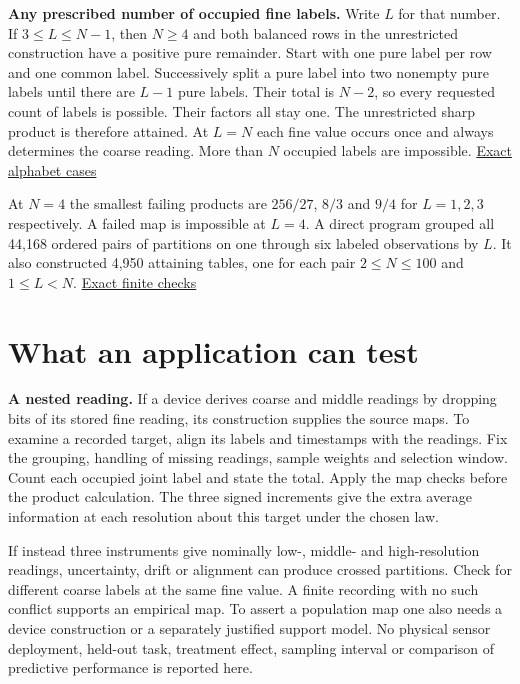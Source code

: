 \textbf{Any prescribed number of occupied fine labels.} Write \(L\) for that number. If \(3\le L\le N-1\), then \(N\ge4\) and both balanced rows in the unrestricted construction have a positive pure remainder. Start with one pure label per row and one common label. Successively split a pure label into two nonempty pure labels until there are \(L-1\) pure labels. Their total is \(N-2\), so every requested count of labels is possible. Their factors all stay one. The unrestricted sharp product is therefore attained. At \(L=N\) each fine value occurs once and always determines the coarse reading. More than \(N\) occupied labels are impossible. \href{https://github.com/sepahead/pid-rs/blob/main/audit/research/nested-categorical-sources/finite-alphabets/reader/exact-alphabet.txt}{Exact alphabet cases}

At \(N=4\) the smallest failing products are \(256/27\), \(8/3\) and \(9/4\) for \(L=1,2,3\) respectively. A failed map is impossible at \(L=4\). A direct program grouped all 44,168 ordered pairs of partitions on one through six labeled observations by \(L\). It also constructed 4,950 attaining tables, one for each pair \(2\le N\le100\) and \(1\le L<N\). \href{https://github.com/sepahead/pid-rs/blob/main/audit/research/nested-categorical-sources/finite-alphabets/reader/EXACT-FINE-CLASSIFICATION.json}{Exact finite checks}

\clearpage

\section{What an application can test}\label{what-an-application-can-test}

\textbf{A nested reading.} If a device derives coarse and middle readings by dropping bits of its stored fine reading, its construction supplies the source maps. To examine a recorded target, align its labels and timestamps with the readings. Fix the grouping, handling of missing readings, sample weights and selection window. Count each occupied joint label and state the total. Apply the map checks before the product calculation. The three signed increments give the extra average information at each resolution about this target under the chosen law.

If instead three instruments give nominally low-, middle- and high-resolution readings, uncertainty, drift or alignment can produce crossed partitions. Check for different coarse labels at the same fine value. A finite recording with no such conflict supports an empirical map. To assert a population map one also needs a device construction or a separately justified support model. No physical sensor deployment, held-out task, treatment effect, sampling interval or comparison of predictive performance is reported here.

